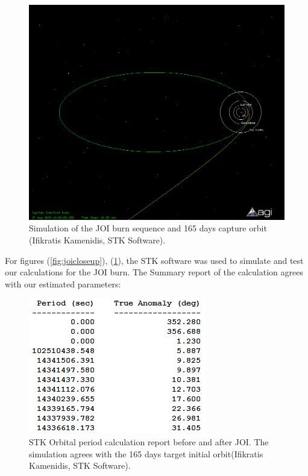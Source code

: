 \begin{figure}[h!]
\centering
\includegraphics[scale=0.4]{figures/Orbiter/JOIfull.png}
\caption{Simulation of the JOI burn sequence and 165 days capture orbit (Ifikratis Kamenidis, STK Software).}
\label{fig:joifull}
\end{figure}

For figures (\ref{fig:joicloseup}), (\ref{fig:joifull}), the STK software was used to simulate and test our calculations for the JOI burn. The Summary report of the calculation agrees with our estimated parameters:

\begin{figure}[h!]
\centering
\includegraphics[scale=0.5]{figures/Orbiter/captorb.png}
\caption{STK Orbital period calculation report before and after JOI. The simulation agrees with the 165 days target initial orbit(Ifikratis Kamenidis, STK Software).}
\end{figure}

